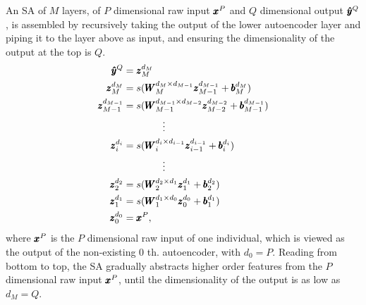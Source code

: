 {An SA of $M$ layers, of $P$ dimensional raw input $\pmb{x}^P$ and $Q$ dimensional output $\pmb{\hat{y}}^Q$, is assembled by recursively taking the output of the lower autoencoder layer and piping it to the layer above as input, and ensuring the dimensionality of the output at the top is $Q$.
\begin{equation} \label{eq:ES}
  \begin{split}
    \pmb{\hat{y}}^Q &= {\pmb{z}_{M}^{d_{M}}} \\
    {\pmb{z}_{M  }^{d_{M  }}} &= s(\pmb{W}_{M  }^{d_{M  } \times d_{M-1}} {\pmb{z}_{M-1}^{d_{M-1}}} + \pmb{b}_{M  }^{d_{M  }}) \\
    {\pmb{z}_{M-1}^{d_{M-1}}} &= s(\pmb{W}_{M-1}^{d_{M-1} \times d_{M-2}} {\pmb{z}_{M-2}^{d_{M-2}}} + \pmb{b}_{M-1}^{d_{M-1}}) \\
    & \quad \quad \quad \quad \vdots \\
    {\pmb{z}_{i  }^{d_{i  }}} &= s(\pmb{W}_{i  }^{d_{i  } \times d_{i-1}} {\pmb{z}_{i-1}^{d_{i-1}}} + \pmb{b}_{i  }^{d_{i  }}) \\
    & \quad \quad \quad \quad \vdots \\
    {\pmb{z}_{2  }^{d_{2  }}} &= s(\pmb{W}_{2  }^{d_{2  } \times d_{1  }} {\pmb{z}_{1  }^{d_{1  }}} + \pmb{b}_{2  }^{d_{2  }}) \\
    {\pmb{z}_{1  }^{d_{1  }}} &= s(\pmb{W}_{1  }^{d_{1  } \times d_{0  }} {\pmb{z}_{0  }^{d_{0  }}} + \pmb{b}_{1  }^{d_{1  }}) \\
    {\pmb{z}_{0  }^{d_{0  }}} &= \pmb{x}^P,
  \end{split}
\end{equation}
where $\pmb{x}^P$ is the $P$ dimensional raw input of one individual, which is viewed as the output of the non-existing $0$ th. autoencoder, with $d_0=P$. Reading from bottom to top, the SA gradually abstracts higher order features from the $P$ dimensional raw input $\pmb{x}^P$, until the dimensionality of the output is as low as $d_M=Q$.

}
